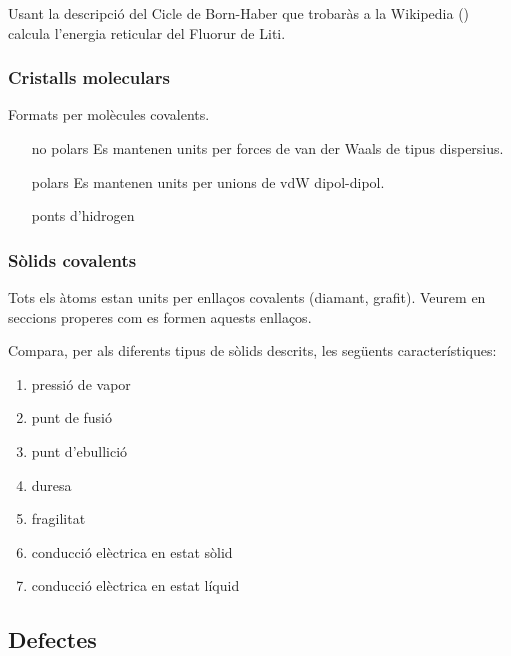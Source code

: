 \begin{exr}
Usant la descripció del Cicle de Born-Haber que trobaràs a la Wikipedia () calcula l'energia reticular del Fluorur de Liti.
\end{exr}

\subsubsection{Cristalls moleculars}

Formats per molècules covalents. 
\begin{itemize}
\item[no polars] Es mantenen units per forces de van der Waals de tipus dispersius.
\item[polars] Es mantenen units per unions de vdW dipol-dipol.
\item[ponts d'hidrogen] 
\end{itemize}  

\subsubsection{Sòlids covalents}

Tots els àtoms estan units per enllaços covalents (diamant, grafit). Veurem en seccions properes com es formen aquests enllaços.


\begin{exr}
Compara, per als diferents tipus de sòlids descrits, les següents característiques:
\begin{enumerate}
\item pressió de vapor
\item punt de fusió
\item punt d'ebullició
\item duresa
\item fragilitat
\item conducció elèctrica en estat sòlid
\item conducció elèctrica en estat líquid
\end{enumerate}
\end{exr}

\subsection{Defectes}

